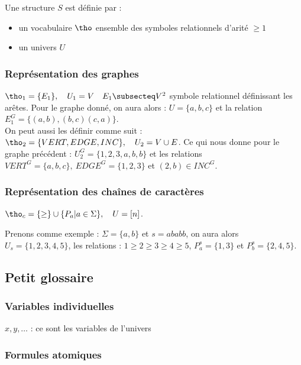 \documentclass[a4paper, 11pt]{report}
\begin{document}
Une structure $S$ est définie par :
\begin{itemize}
    \item un vocabulaire $\tho$ ensemble des symboles relationnels d'arité $\geq 1$
    \item un univers $U$
\end{itemize}

\subsubsection{Représentation des graphes}


$\tho_1 = \{E_1\}, \quad U_1 = V \quad E_1 \subsecteq V^2$ symbole relationnel définissant les
arêtes. Pour le graphe donné, on aura alors : $U = \{a, b, c\}$ et la relation $E_1^G = \{(a,b),
(b,c) (c,a)\}$.
\\

On peut aussi les définir comme suit :\\
$\tho_2 = \{ VERT, EDGE, INC \}, \quad U_2 = V \cup E $. Ce qui nous donne pour le graphe précédent
: $U_2^G = \{1,2,3,a,b,b\}$ et les relations $VERT^G = \{a, b, c\},\ EDGE^G = \{1,2,3\}$ et $(2,b) \in
INC^G$.

\subsubsection{Représentation des chaînes de caractères}

$\tho_c = \{\geq\} \cup \{P_a | a \in \Sigma\}, \quad U = [n]$.

Prenons comme exemple : $\Sigma = \{a, b\}$ et $s = ababb$, on aura alors $U_s = \{1,2,3,4,5\}$, les
relations : $1 \geq 2 \geq 3 \geq 4 \geq 5$, $P_a^s = \{1, 3\}$ et $P_b^s = \{2, 4, 5 \}$.

\subsection{Petit glossaire}

\subsubsection{Variables individuelles}

$x, y, \dots$ : ce sont les variables de l'univers

\subsubsection{Formules atomiques}
\end{document}
